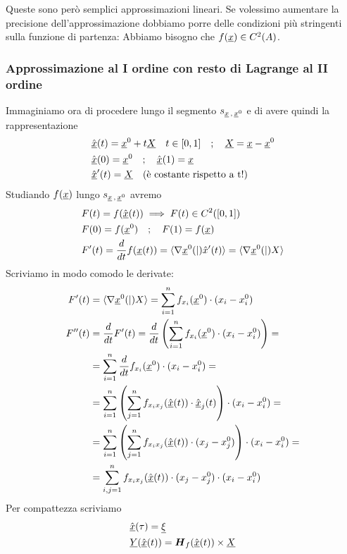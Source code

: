 Queste sono però semplici approssimazioni lineari. Se volessimo aumentare la precisione dell'approssimazione dobbiamo porre delle condizioni più stringenti sulla funzione di partenza: Abbiamo bisogno che $f(\underline{x})\in C^2(A)$.

\newpage

\subsubsection{Approssimazione al I ordine con resto di Lagrange al II ordine}
Immaginiamo ora di procedere lungo il segmento $s_{\underline{x} \, , \, \underline{x}^0}$ e di avere quindi la rappresentazione
\begin{align}
	{}&\hat{\underline{x}}(t)=\underline{x}^0 + t \underline{X} \quad t\in [0,1] \quad ; \quad \underline{X} = \underline{x} - \underline{x}^0\\
	&\hat{\underline{x}}(0)=\underline{x}^0 \quad ; \quad \hat{\underline{x}}(1)=\underline{x} \\
	&\hat{\underline{x}}'(t)= \underline{X} \quad \text{(è costante rispetto a t!)} 
\end{align}
Studiando $f(\underline{x})$ lungo $s_{\underline{x} \, , \, \underline{x}^0}$ avremo
\begin{align}
	{}&F(t)=f(\hat{\underline{x}}(t))\implies F(t)\in C^2([0,1])\\
	&F(0)=f(\underline{x}^0) \quad ; \quad F(1)=f(\underline{x})\\
	&F'(t)=\frac{d }{d t}f(\underline{x}(t))=\braket{\nabla \underline{x}^0(|)\hat{x}'(t)}=\braket{\nabla \underline{x}^0(|)X}
\end{align}
Scriviamo in modo comodo le derivate:
\begin{align}
	F'(t){}&=\braket{\nabla \underline{x}^0(|)X}=\sum_{i=1}^{n} f_{x_i}(\underline{x}^0)\cdot (x_i - x_i^0) \\
	F''(t)&=\frac{d }{d t}F'(t)= \frac{d }{d t} \left(\sum_{i=1}^{n} f_{x_i}(\underline{x}^0)\cdot (x_i - x_i^0)\right) =\nonumber \\
	&= \sum_{i=1}^{n} \frac{d }{d t} f_{x_i}(\underline{x}^0)\cdot (x_i - x_i^0)= \nonumber \\
	&= \sum_{i=1}^{n} \left(\sum_{j=1}^{n} f_{x_i x_j} (\hat{\underline{x}}(t)) \cdot \hat{\underline{x}}_j(t) \right) \cdot (x_i - x_i^0)=\nonumber \\
	&= \sum_{i=1}^{n} \left(\sum_{j=1}^{n} f_{x_i x_j} (\hat{\underline{x}}(t)) \cdot (x_j - x_j^0) \right) \cdot (x_i - x_i^0)= \nonumber \\
	&= \sum_{i,j=1}^{n} f_{x_i x_j} (\hat{\underline{x}}(t)) \cdot (x_j - x_j^0) \cdot (x_i - x_i^0)
\end{align}
Per compattezza scriviamo
\begin{align}
	{}&\hat{\underline{x}}(\tau)=\underline{\xi}\\
	&\underline{Y}(\hat{\underline{x}}(t)) =  \boldsymbol{H}_{f} (\hat{\underline{x}}(t))  \times \underline{X}
\end{align}
